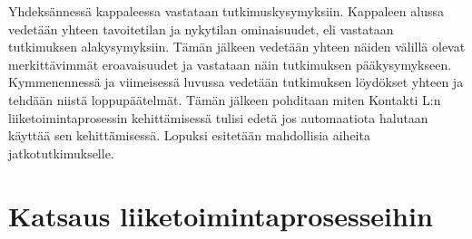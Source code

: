 \documentclass[finnish,12pt,a4paper,pdftex]{article}
\begin{document}
Yhdeksännessä kappaleessa vastataan tutkimuskysymyksiin. Kappaleen alussa vedetään yhteen tavoitetilan ja nykytilan ominaisuudet, eli vastataan tutkimuksen alakysymyksiin. Tämän jälkeen vedetään yhteen näiden välillä olevat merkittävimmät eroavaisuudet ja vastataan näin tutkimuksen pääkysymykseen.\\

Kymmenennessä ja viimeisessä luvussa vedetään tutkimuksen löydökset yhteen ja tehdään niistä loppupäätelmät. Tämän jälkeen pohditaan miten Kontakti L:n liiketoimintaprosessin kehittämisessä tulisi edetä jos automaatiota halutaan käyttää sen kehittämisessä. Lopuksi esitetään mahdollisia aiheita jatkotutkimukselle.









\clearpage

\section{Katsaus liiketoimintaprosesseihin}
\end{document}

